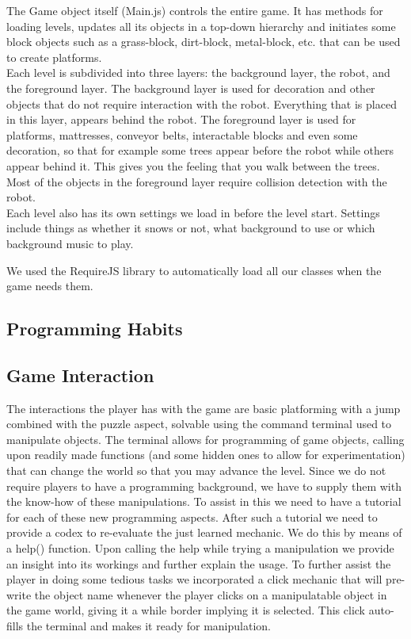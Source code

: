 \documentclass[a4paper,twoside,12pt]{article}
\begin{document}
The Game object itself (Main.js) controls the entire game. It has methods for loading levels, updates all its objects in a top-down hierarchy and initiates some block objects such as a grass-block, dirt-block, metal-block, etc. that can be used to create platforms.\\

Each level is subdivided into three layers: the background layer, the robot, and the foreground layer. The background layer is used for decoration and other objects that do not require interaction with the robot. Everything that is placed in this layer, appears behind the robot. The foreground layer is used for platforms, mattresses, conveyor belts, interactable blocks and even some decoration, so that for example some trees appear before the robot while others appear behind it. This gives you the feeling that you walk between the trees. Most of the objects in the foreground layer require collision detection with the robot.\\

Each level also has its own settings we load in before the level start. Settings include things as whether it snows or not, what background to use or which background music to play.

We used the RequireJS library to automatically load all our classes when the game needs them. 

\subsection{Programming Habits}

\subsection{Game Interaction}
The interactions the player has with the game are basic platforming with a jump combined with the puzzle aspect, solvable using the command terminal used to manipulate objects. The terminal allows for programming of game objects, calling upon readily made functions (and some hidden ones to allow for experimentation) that can change the world so that you may advance the level. Since we do not require players to have a programming background, we have to supply them with the know-how of these manipulations. To assist in this we need to have a tutorial for each of these new programming aspects. After such a tutorial we need to provide a codex to re-evaluate the just learned mechanic. We do this by means of a help() function. Upon calling the help while trying a manipulation we provide an insight into its workings and further explain the usage. To further assist the player in doing some tedious tasks we incorporated a click mechanic that will pre-write the object name whenever the player clicks on a manipulatable object in the game world, giving it a while border implying it is selected. This click auto-fills the terminal and makes it ready for manipulation.
\end{document}

